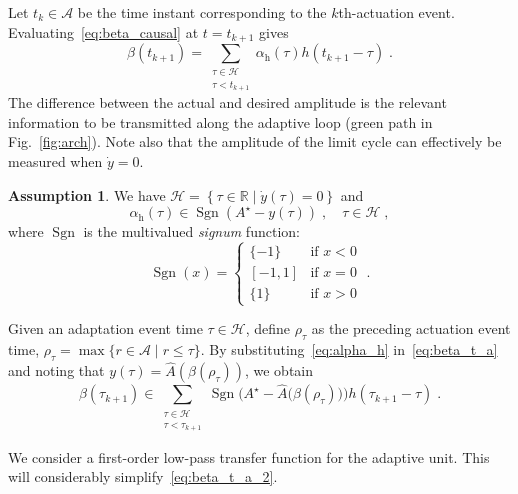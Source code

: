 \documentclass{article}
\newcommand{\AC}{\mathcal{A}}
\newcommand{\HH}{\mathcal{H}}
\newcommand{\RR}{\mathbb{R}}
\newcommand{\rh}{\mathrm{h}}
\DeclareMathOperator{\sgn}{Sgn}
\theoremstyle{definition}
\newtheorem{assumption}{Assumption}
\theoremstyle{remark}
\begin{document}
Let $t_k \in \AC$ be the time instant corresponding to the $k$th-actuation event. Evaluating~\eqref{eq:beta_causal} at $t = t_{k+1}$ gives
\begin{equation} \label{eq:beta_t_a}
    \beta\left(t_{k+1}\right) = \sum_{\substack{\tau \in \HH \\ \tau < t_{k+1}}}\alpha_\rh(\tau)h\left(t_{k+1}-\tau\right) \;.
\end{equation}
The difference between the actual and desired amplitude is the relevant information to be transmitted along the adaptive loop (green path in Fig.~\ref{fig:arch}). Note also that the amplitude of the limit cycle can effectively be measured when $\dot y=0$.

\begin{assumption} \label{ass:adaptation_events}
    We have $\HH = \left\{ \tau \in \RR \mid \dot{y}(\tau) = 0 \right\}$ and
    \begin{equation} \label{eq:alpha_h}
        \alpha_\rh(\tau) \in \sgn(A^\star-y(\tau)) \;, \quad \tau \in \HH \;,
    \end{equation}
    where $\sgn$ is the multivalued \emph{signum} function: 
    \begin{displaymath}
        \sgn(x) = 
        \begin{cases}
            \{-1\} & \text{if $x < 0$} \\
            [-1,1] & \text{if $x = 0$} \\
             \{1\} & \text{if $x > 0$}
        \end{cases} \;.
    \end{displaymath}
\end{assumption}

Given an adaptation event time $\tau \in \HH$, define $\rho_\tau$ as the preceding actuation event time, $\rho_\tau = \max\{r \in \AC \mid r \le \tau\}$. By substituting~\eqref{eq:alpha_h} in~\eqref{eq:beta_t_a} and noting that $y(\tau) = \hat{A}(\beta(\rho_\tau))$, %
we obtain
\begin{equation} \label{eq:beta_t_a_2}
    \beta\left(\tau_{k+1}\right) \in \sum_{\substack{\tau \in \HH \\ \tau < \tau_{k+1}}}\sgn\Big(A^\star-\hat{A}\big(\beta(\rho_\tau)\big)\Big)h\left(\tau_{k+1}-\tau\right) \;.
\end{equation}

We consider a first-order low-pass transfer function for the adaptive unit. This will considerably simplify~\eqref{eq:beta_t_a_2}.
\end{document}
